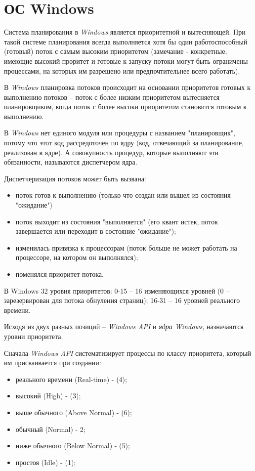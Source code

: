\section{ОС Windows}

Система планирования в \textit{Windows} является приоритетной и вытесняющей. При такой системе планирования всегда выполняется хотя бы один работоспособный (готовый) поток с самым высоким приоритетом (замечание - конкретные, имеющие высокий проритет и готовые к запуску потоки могут быть ограничены процессами, на которых им разрешено или предпочтительнее всего работать).

В \textit{Windows} планировка потоков происходит на основании приоритетов готовых к выполнению потоков -- поток с более низким приоритетом вытесняется планировщиком, когда поток с более высоки приоритетом становится готовым к выполнению.

В \textit{Windows} нет единого модуля или процедуры с названием "планировщик", потому что этот код рассредоточен по ядру (код, отвечающий за планирование, реализован в ядре). А совокупность процедур, которые выполняют эти обязанности, называются диспетчером ядра.

Диспетчеризация потоков может быть вызвана:

\begin{itemize}
    \item поток готов к выполнению (только что создан или вышел из состояния "ожидание")
    \item поток выходит из состояния "выполняется" (его квант истек, поток завершается или переходит в состояние "ожидание");
    \item изменилась привязка к процессорам (поток больше не может работать на процессоре, на котором он выполнялся);
    \item поменялся приоритет потока.
\end{itemize}

В Windows 32 уровня приоритетов: 0-15 -- 16 изменяющихся уровней (0 -- зарезервирован для потока обнуления страниц); 16-31 -- 16 уровней реального времени.


Исходя из двух разных позиций -- \textit{Windows API} и \textit{ядра Windows}, назначаются уровни приоритета.

Сначала \textit{Windows API} систематизирует процессы по классу приоритета, который им присваивается при создании:

\begin{itemize}
    \item реального времени (Real-time) - (4);
    \item высокий (High) - (3);
    \item выше обычного (Above Normal) - (6);
    \item обычный (Normal) - 2;
    \item ниже обычного (Below Normal) - (5);
    \item простоя (Idle) - (1);
\end{itemize}


